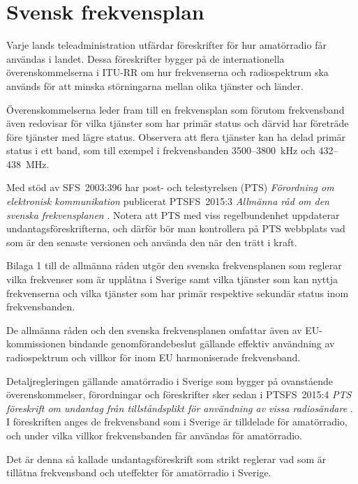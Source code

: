 \chapter{Svensk frekvensplan}
\label{svensk frekvensplan}

Varje lands teleadministration utfärdar föreskrifter för hur amatörradio får
användas i landet.
Dessa föreskrifter bygger på de internationella överenskommelserna i ITU-RR
\cite[ARTICLE 5]{ITU-RR} om hur frekvenserna och radiospektrum ska används för
att minska störningarna mellan olika tjänster och länder.

Överenskommelserna leder fram till en frekvensplan som förutom frekvensband även
redovisar för vilka tjänster som har primär status och därvid har företräde före
tjänster med lägre status.
Observera att flera tjänster kan ha delad primär status i ett band, som till
exempel i frekvensbanden 3500--3800~kHz och 432--438~MHz.

Med stöd av SFS~2003:396 har post- och telestyrelsen (PTS) 
\emph{Förordning om elektronisk kommunikation} \cite{SFS2003:396}
publicerat PTSFS~2015:3 \emph{Allmänna råd om den svenska frekvensplanen}
\cite{PTSFS2015:3}.
Notera att PTS med viss regelbundenhet uppdaterar undantagsföreskrifterna,
och därför bör man kontrollera på PTS webbplats vad som är den senaste versionen
och använda den när den trätt i kraft.

Bilaga 1 till de allmänna råden utgör den svenska frekvensplanen som reglerar
vilka frekvenser som är upplåtna i Sverige samt vilka tjänster som kan nyttja
frekvenserna och vilka tjänster som har primär respektive sekundär status inom
frekvensbanden.

\newpage

De allmänna råden och den svenska frekvensplanen omfattar även av
EU-kommissionen bindande genomförandebeslut gällande effektiv användning av
radiospektrum och villkor för inom EU harmoniserade frekvensband.

Detaljregleringen gällande amatörradio i Sverige som bygger på ovanstående
överenskommelser, förordningar och föreskrifter sker sedan i PTSFS~2015:4
\emph{PTS föreskrift om undantag från tillståndsplikt för användning av vissa
  radiosändare} \cite{PTSFS2015:4}.
I föreskriften anges de frekvensband som i Sverige är tilldelade för
amatörradio, och under vilka villkor frekvensbanden får användas för
amatörradio.

Det är denna så kallade undantagsföreskrift som strikt reglerar vad som är
tillåtna frekvensband och uteffekter för amatörradio i Sverige.

